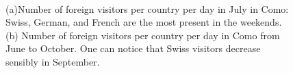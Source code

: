 {%

\begin{figure}[p]
\centering
{}\\
\caption{(a)Number of foreign visitors per country per day in July in Como: Swiss, German, and French are the most present in the weekends. (b) Number of foreign visitors per country per day in Como from June to October. One can notice that Swiss visitors decrease sensibly in September.}
        \label{fig:como_country_day}
\end{figure}

}
